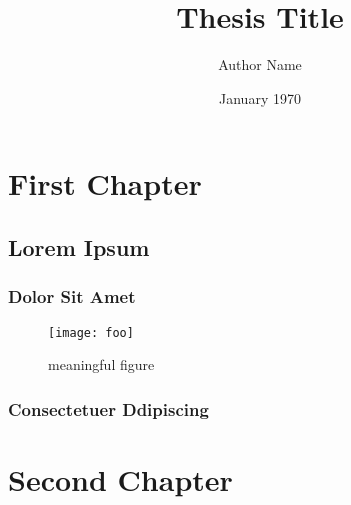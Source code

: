 \documentclass[ %
    scrbook,
    listoffigures,
    listoftables, 
    glossary]{cu-thesis}
\title{Thesis Title}
\author{Author Name}
\date{January 1970}
\begin{document}
    \frontmatter

    \chapter{First Chapter}
    \lipsum[1]

    \section*{Lorem Ipsum}
    \lipsum[3-5]

    \subsection*{Dolor Sit Amet}
    \lipsum[6-9]
    \begin{figure}
        \centering
        \texttt{[image: foo]}
        \caption[]{meaningful figure~\cite{nash51}}
    \end{figure}

    \subsection*{Consectetuer Ddipiscing}
    \lipsum[10-11]

    \chapter{Second Chapter}

    \appendix

    
    
\end{document}
